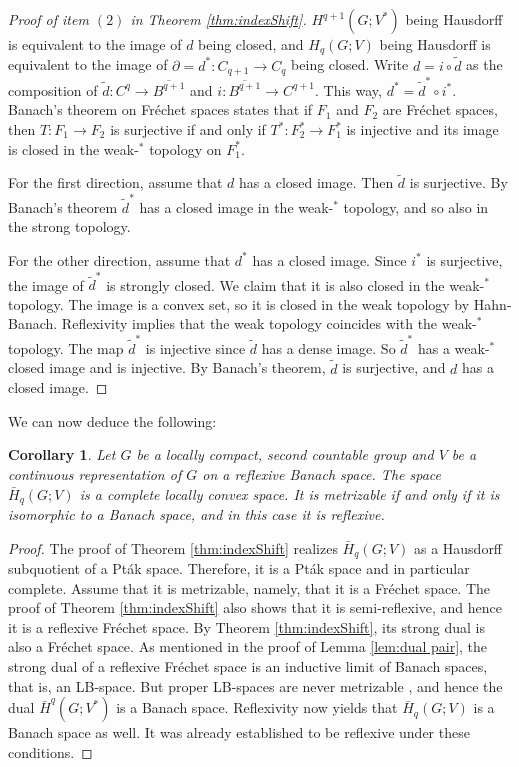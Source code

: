 \documentclass[12pt,reqno]{amsart}
\newtheorem{corollary}[theorem]{Corollary}
\theoremstyle{definition}
\begin{document}
\begin{proof}[Proof of item $(2)$ in Theorem \ref{thm:indexShift}]
  $H^{q+1}(G;V^*)$ being Hausdorff is equivalent to the image of $d$ being closed, and $H_q(G;V)$ being Hausdorff is equivalent to the image of $\partial = d^*\colon C_{q+1} \rightarrow C_q$ being closed. Write $d = i \circ \tilde{d}$ as the composition of $\tilde{d}\colon C^q \rightarrow \overline{B^{q+1}}$ and $i\colon \overline{B^{q+1}} \rightarrow C^{q+1}$. This way, $d^* =  \tilde{d}^* \circ i^*$. Banach's theorem on Fr\'echet spaces states that if $F_1$ and $F_2$ are Fr\'echet spaces, then $T\colon F_1 \rightarrow F_2$ is surjective if and only if $T^*\colon F_2^* \rightarrow F_1^*$ is injective and its image is closed in the weak-$^*$ topology on $F_1^*$.

For the first direction, assume that $d$ has a closed image. Then $\tilde{d}$ is surjective. By Banach's theorem $\tilde{d}^*$ has a closed image in the weak-$^*$ topology, and so also in the strong topology.

For the other direction, assume that $d^*$ has a closed image. Since $i^*$ is surjective, the image of $\tilde{d}^*$ is strongly closed. We claim that it is also closed in the weak-$^*$ topology. The image is a convex set, so it is closed in the weak topology by Hahn-Banach. Reflexivity implies that the weak topology coincides with the weak-$^*$ topology. The map $\tilde{d}^*$ is injective since $\tilde{d}$ has a dense image. So $\tilde{d}^*$ has a weak-$^*$ closed image and  is injective. By Banach's theorem, $\tilde{d}$ is surjective, and $d$ has a closed image.
\end{proof}

We can now deduce the following:

\begin{corollary}\label{cor:homIsNotMetr}
    Let $G$ be a locally compact, second countable group and $V$ be a continuous representation of $G$ on a reflexive Banach space. The space $\bar{H}_q(G;V)$ is a complete locally convex space. It is metrizable if and only if it is isomorphic to a Banach space, and in this case it is reflexive.
\end{corollary}
\begin{proof}
    The proof of Theorem \ref{thm:indexShift} realizes $\bar{H}_q(G;V)$ as a Hausdorff subquotient of a Pt\'ak space. Therefore, it is a Pt\'ak space and in particular complete. Assume that it is metrizable, namely, that it is a Fr\'echet space. The proof of Theorem \ref{thm:indexShift} also shows that it is semi-reflexive, and hence it is a reflexive Fr\'echet space. By Theorem \ref{thm:indexShift}, its strong dual is also a Fr\'echet space. As mentioned in the proof of Lemma \ref{lem:dual pair}, the strong dual of a reflexive Fr\'echet space is an inductive limit of Banach spaces, that is, an LB-space. But proper LB-spaces are never metrizable \cite[Proposition~8.5.18]{BonerPerezcarreras}, and hence the dual $\bar{H}^q(G;V^*)$ is a Banach space. Reflexivity now yields that $\bar{H}_q(G;V)$ is a Banach space as well. It was already established to be reflexive under these conditions. 
\end{proof}
\end{document}
